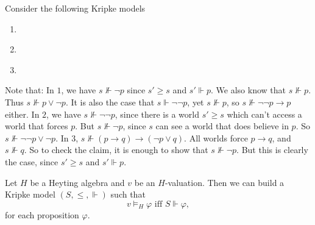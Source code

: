 \documentclass{article}
\numberwithin{thm}{subsection}
\begin{document}
\begin{exs}
    Consider the following Kripke models \begin{enumerate}
        \item \hspace{0.1cm}
        \begin{center}
        \end{center}
        \item \hspace{0.1cm}
        \begin{center}
        \end{center}
        \item \hspace{0.1cm}
        \begin{center}
        \end{center}
    \end{enumerate}
    Note that: In $1$, we have $s \nVdash \neg p$ since $s' \geq s$ and $s' \Vdash p$. We also know that $s \nVdash p$. Thus $s \nVdash p \vee \neg p$. It is also the case that $s \Vdash \neg \neg p$, yet $s \nVdash p$, so $s \nVdash \neg \neg p \rightarrow p$ either. \gap 
    In $2$, we have $s \nVdash \neg \neg p$, since there is a world $s' \geq s$ which can't access a world that forces $p$. But $s \nVdash \neg p$, since $s$ can see a world that does believe in $p$. So $s \nVdash \neg \neg p \vee \neg p$. \gap 
    In $3$, $s \nVdash (p \rightarrow q) \rightarrow (\neg p \vee q)$. All worlds force $p \rightarrow q$, and $s \nVdash q$. So to check the claim, it is enough to show that $s \nVdash \neg p$. But this is clearly the case, since $s' \geq s$ and $s' \Vdash p$.
\end{exs}
\begin{fancylem}{}
    Let $H$ be a Heyting algebra and $v$ be an $H$-valuation. Then we can build a Kripke model $(S, \leq, \Vdash)$ such that \[ 
        v \vDash_{H} \varphi \text{ iff } S \Vdash \varphi,\] for each proposition $\varphi$.
\end{fancylem}
\end{document}
